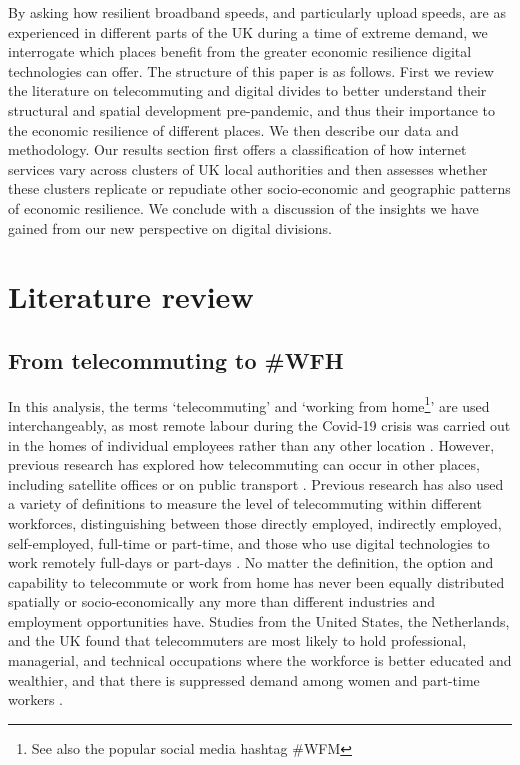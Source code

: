 \documentclass[]{interact}
\theoremstyle{plain}%
\theoremstyle{definition}
\theoremstyle{remark}
\begin{document}
By asking how resilient broadband speeds, and particularly upload
speeds, are as experienced in different parts of the UK during a time of
extreme demand, we interrogate which places benefit from the greater
economic resilience digital technologies can offer. The structure of
this paper is as follows. First we review the literature on
telecommuting and digital divides to better understand their structural
and spatial development pre-pandemic, and thus their importance to the
economic resilience of different places. We then describe our data and
methodology. Our results section first offers a classification of how
internet services vary across clusters of UK local authorities and then
assesses whether these clusters replicate or repudiate other
socio-economic and geographic patterns of economic resilience. We
conclude with a discussion of the insights we have gained from our new
perspective on digital divisions.

\hypertarget{sec:2}{%
\section{Literature review}\label{sec:2}}

\hypertarget{sec:2.1}{%
\subsection{From telecommuting to \#WFH}\label{sec:2.1}}

In this analysis, the terms `telecommuting' and `working from
home\footnote{See also the popular social media hashtag \#WFM}' are used
interchangeably, as most remote labour during the Covid-19 crisis was
carried out in the homes of individual employees rather than any other
location \citep{eurofound2020}. However, previous research has explored
how telecommuting can occur in other places, including satellite offices
or on public transport \citep{felstead2012rapid, siha2006telecommuting}.
Previous research has also used a variety of definitions to measure the
level of telecommuting within different workforces, distinguishing
between those directly employed, indirectly employed, self-employed,
full-time or part-time, and those who use digital technologies to work
remotely full-days or part-days
\citep{allen2015effective, bailey2002review, haddad2009examination}. No
matter the definition, the option and capability to telecommute or work
from home has never been equally distributed spatially or
socio-economically any more than different industries and employment
opportunities have. Studies from the United States, the Netherlands, and
the UK found that telecommuters are most likely to hold professional,
managerial, and technical occupations where the workforce is better
educated and wealthier, and that there is suppressed demand among women
and part-time workers
\citep{headicar2016move, peters2004employees, singh2013modeling}.
\end{document}

